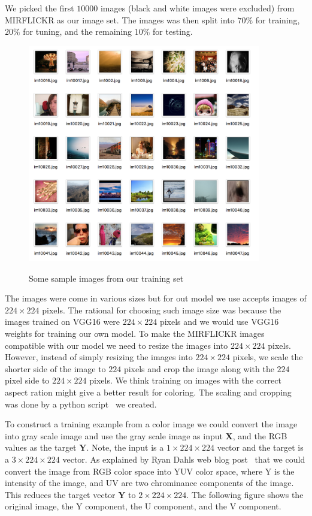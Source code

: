 \documentclass[12pt]{article}
\begin{document}
We picked the first $10000$ images (black and white images were excluded) from MIRFLICKR as our image set. The images was then split into $70\%$ for training, $20\%$ for tuning, and the remaining $10\%$ for testing. 

\begin{figure}[!ht]
 \centering
  \includegraphics[width=4.0in]{resource/exampleimages.png}
 \label{sampleimages}
 \caption{Some sample images from our training set}
\end{figure}


The images were come in various sizes but for out model we use accepts images of $224\times224$ pixels. The rational for choosing such image size was because the images trained on VGG16 were $224\times224$ pixels and we would use VGG16 weights for training our own model. To make the MIRFLICKR images compatible with our model we need to resize the images into $224\times224$ pixels. However, instead of simply resizing the images into $224\times224$ pixels, we scale the shorter side of the image to $224$ pixels and crop the image along with the $224$ pixel side to  $224\times224$ pixels. We think training on images with the correct aspect ration might give a better result for coloring. The scaling and cropping was done by a python script~\cite{PYDATA} we created.

To construct a training example from a color image we could convert the image into gray scale image and use the gray scale image as input $\boldsymbol{X}$, and the RGB values as the target $\boldsymbol{Y}$. Note, the input is a $1\times224\times224$ vector and the target is a $3\times224\times224$ vector. As explained by Ryan Dahl\textquotesingle s web blog post~\cite{RYAN2016} that we could convert the image from RGB color space into YUV color space, where Y is the intensity of the image, and UV are two chrominance components of the image. This reduces the target vector $\boldsymbol{Y}$ to $2\times224\times224$. The following figure shows the original image, the Y component, the U component, and the V component. 
\end{document}
